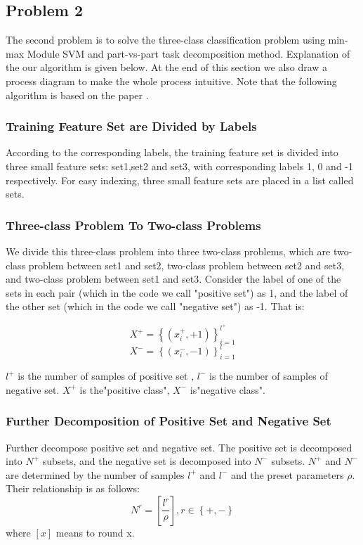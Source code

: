 \subsection{Problem 2}
The second problem is to solve the three-class classification problem using min-max Module SVM and part-vs-part task decomposition method. Explanation of the our algorithm is given below. At the end of this section we also draw a process diagram to make the whole process intuitive. Note that the following algorithm is based on the paper\cite{lu2000emergence} \cite{王开安2005最小最大模块化支持向量机及其在文本分类中的应用}.
\subsubsection{Training Feature Set are Divided by Labels}
According to the corresponding labels, the training feature set is divided into three small feature sets: set1,set2 and set3, with corresponding labels 1, 0 and -1 respectively. For easy indexing, three small feature sets are placed in a list called sets.
\subsubsection{Three-class Problem To Two-class Problems}
We divide this three-class problem into three two-class problems, which are two-class problem between set1 and set2, two-class problem between set2 and set3, and two-class problem between set1 and set3. Consider the label of one of the sets in each pair (which in the code we call "positive set") as 1, and the label of the other set (which in the code we call "negative set") as -1. That is:

$$X^{+} =\left \{ \left ( x_{i}^{+} ,+1  \right )  \right \} _{i=1}^{l^{+} }$$
$$X^{-} =\left \{ \left ( x_{i}^{-} ,-1  \right )  \right \} _{i=1}^{l^{-} }$$


$l^{+}$ is the number of samples of positive set , $l^{-}$ is the number of samples of negative set. $X^{+}$ is the"positive class", $X^{-}$ is"negative class".


\subsubsection{Further Decomposition of Positive Set and Negative Set}
Further decompose positive set and negative set. The positive set is decomposed into $N^{+}$ subsets, and the negative set is decomposed into $N^{-}$ subsets. $N^{+}$ and $N^{-}$ are determined by the number of samples $l^{+}$ and $l^{-}$ and the preset parameters $\rho$. Their relationship is as follows:
$$N^{r} =\left [ \frac{l^{r} }{\rho }  \right ] ,r\in \left \{ +,- \right \} $$
where $\left [ x \right ]$ means to round x.



